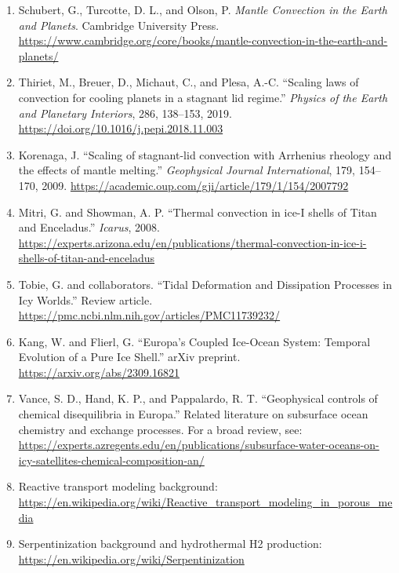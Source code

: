 \documentclass[11pt]{article}
\begin{document}
\begin{enumerate}
    \item Schubert, G., Turcotte, D. L., and Olson, P. \textit{Mantle
    Convection in the Earth and Planets}. Cambridge University Press.
    \url{https://www.cambridge.org/core/books/mantle-convection-in-the-earth-and-planets/}

    \item Thiriet, M., Breuer, D., Michaut, C., and Plesa, A.-C. ``Scaling laws
    of convection for cooling planets in a stagnant lid regime.'' \textit{Physics
    of the Earth and Planetary Interiors}, 286, 138--153, 2019.
    \url{https://doi.org/10.1016/j.pepi.2018.11.003}

    \item Korenaga, J. ``Scaling of stagnant-lid convection with Arrhenius
    rheology and the effects of mantle melting.'' \textit{Geophysical Journal
    International}, 179, 154--170, 2009.
    \url{https://academic.oup.com/gji/article/179/1/154/2007792}

    \item Mitri, G. and Showman, A. P. ``Thermal convection in ice-I shells of
    Titan and Enceladus.'' \textit{Icarus}, 2008.
    \url{https://experts.arizona.edu/en/publications/thermal-convection-in-ice-i-shells-of-titan-and-enceladus}

    \item Tobie, G. and collaborators. ``Tidal Deformation and Dissipation
    Processes in Icy Worlds.'' Review article.
    \url{https://pmc.ncbi.nlm.nih.gov/articles/PMC11739232/}

    \item Kang, W. and Flierl, G. ``Europa's Coupled Ice-Ocean System: Temporal
    Evolution of a Pure Ice Shell.'' arXiv preprint.
    \url{https://arxiv.org/abs/2309.16821}

    \item Vance, S. D., Hand, K. P., and Pappalardo, R. T. ``Geophysical
    controls of chemical disequilibria in Europa.'' Related literature on
    subsurface ocean chemistry and exchange processes. For a broad review, see:
    \url{https://experts.azregents.edu/en/publications/subsurface-water-oceans-on-icy-satellites-chemical-composition-an/}

    \item Reactive transport modeling background:
    \url{https://en.wikipedia.org/wiki/Reactive_transport_modeling_in_porous_media}

    \item Serpentinization background and hydrothermal H2 production:
    \url{https://en.wikipedia.org/wiki/Serpentinization}
\end{enumerate}
\end{document}
